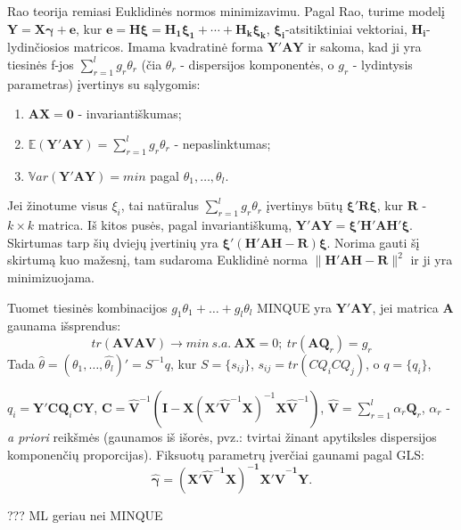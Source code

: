 \documentclass[12pt,a4paper]{article}
\begin{document}
\indent Rao teorija remiasi Euklidinės normos minimizavimu. Pagal Rao, turime modelį $\mathbf{Y}=\mathbf{X}\boldsymbol{\gamma}+\mathbf{e}$, kur $\mathbf{e}=\mathbf{H\boldsymbol{\xi}}=\mathbf{\boldsymbol{H_1\xi_1+\cdots +H_k \xi_k}}$, $\boldsymbol{\xi_i}$-atsitiktiniai vektoriai, $\mathbf{H_i}$-lydinčiosios matricos. Imama kvadratinė forma $\mathbf{Y'AY}$ ir sakoma, kad ji yra tiesinės f-jos $\sum^l_{r=1} g_r\theta_r$ (čia $\theta_r$ - dispersijos komponentės, o $g_r$ - lydintysis parametras) įvertinys su sąlygomis:
\begin{enumerate}
\item $\mathbf{AX=0}$ - invariantiškumas;
\item $\mathbb{E}\left(\mathbf{Y'AY}\right)=\sum^l_{r=1} g_r\theta_r$ - nepaslinktumas;
\item $\mathbb{V}ar\left(\mathbf{Y'AY}\right)=min$ pagal $\theta_1, \dots, \theta_l$.
\end{enumerate}

\indent Jei žinotume visus $\xi_i$, tai natūralus $\sum^l_{r=1} g_r\theta_r$ įvertinys būtų $\boldsymbol{\xi'R\xi}$, kur $\mathbf{R}$ - $k\times k$ matrica. Iš kitos pusės, pagal invariantiškumą, $\mathbf{Y'AY=\boldsymbol{\xi'H'AH'\xi}}$. Skirtumas tarp šių dviejų įvertinių yra $\boldsymbol{\xi'\left(H'AH-R\right)\xi}$. Norima gauti šį skirtumą kuo mažesnį, tam sudaroma Euklidinė norma $\|\boldsymbol{H'AH-R}\|^2$ ir ji yra minimizuojama.

\indent Tuomet tiesinės kombinacijos $g_1 \theta_1+\dots+g_l \theta_l$ MINQUE yra $\mathbf{Y'AY}$, jei matrica $\mathbf{A}$ gaunama išsprendus:
\[tr(\mathbf{AVAV}) \to min \ s.a. \ \mathbf{AX} = 0;\ tr(\mathbf{AQ}_r)=g_r\]
\indent Tada $\hat{\theta} = (\hat{\theta_1},\dots,\hat{\theta_l})'=S^{-1}q$, kur $S=\{s_{ij}\}$, $s_{ij}=tr(CQ_iCQ_j)$, o
$q=\{q_i\}$,

\noindent $q_i=\mathbf{Y'CQ}_i\mathbf{CY}$, $\mathbf{C} = \mathbf{\hat{V}}^{-1}\left(\mathbf{I}-\mathbf{X}\left(\mathbf{X' \hat{V}}^{-1}\mathbf{X}\right)^{-1}\mathbf{X \hat{V}}^{-1}\right)$, $\mathbf{\hat{V}}=\sum^l_{r=1}\alpha_r\mathbf{Q}_r$, $\alpha_r$ - \textit{a priori} reikšmės (gaunamos iš išorės, pvz.: tvirtai žinant apytiksles dispersijos komponenčių proporcijas). Fiksuotų parametrų įverčiai gaunami pagal GLS\cite{rao1972}:
\[\boldsymbol{\hat{\gamma}}=\mathbf{\left(X'\hat{V}^{-1}X\right)^{-1}}\mathbf{X'\hat{V}^{-1}Y}.\]

???\cite{MLbetterMINQUE} ML geriau nei MINQUE
\end{document}

